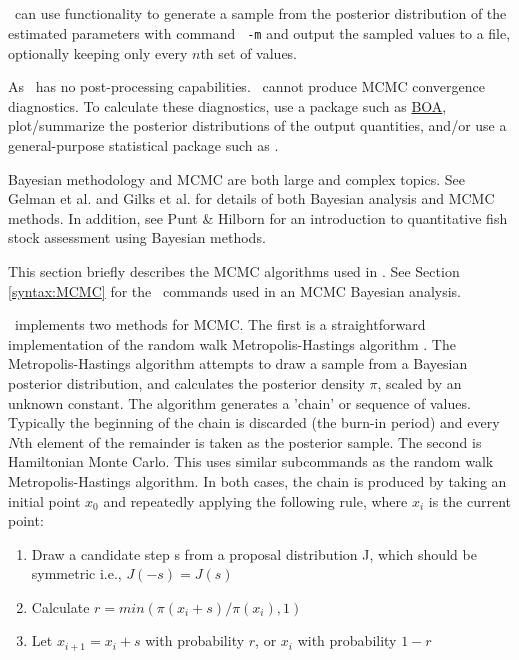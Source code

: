 \subsection{}\label{sec:MCMC}\label{sec:MCMC-RandomWalkMetropolisHastings}

\CNAME\ can use  functionality to generate a sample from the posterior distribution of the estimated parameters with command \texttt{\cname\ -m} and output the sampled values to a file, optionally keeping only every $n$th set of values.

As \CNAME\ has no post-processing capabilities. \CNAME\ cannot produce MCMC convergence diagnostics. To calculate these diagnostics, use a package such as \href{http://www.public-health.uiowa.edu/boa}{BOA}, plot/summarize the posterior distributions of the output quantities, and/or use a general-purpose statistical package such as \href{http://www.r-project.org}{\R}.

Bayesian methodology and MCMC are both large and complex topics. See Gelman et al. \citeyearpar{823} and Gilks et al. \citeyearpar{143} for details of both Bayesian analysis and MCMC methods. In addition, see Punt \& Hilborn \citeyearpar{828} for an introduction to quantitative fish stock assessment using Bayesian methods.

This section briefly describes the MCMC algorithms used in \CNAME. See Section \ref{syntax:MCMC} for the \CNAME\ commands used in an MCMC Bayesian analysis.

\CNAME\ implements two methods for MCMC. The first is a straightforward implementation of the random walk Metropolis-Hastings algorithm \citep{823,143}. The Metropolis-Hastings algorithm attempts to draw a sample from a Bayesian posterior distribution, and calculates the posterior density $\pi$, scaled by an unknown constant. The algorithm generates a 'chain' or sequence of values. Typically the beginning of the chain is discarded (the burn-in period) and every $N$th element of the remainder is taken as the posterior sample. The second is Hamiltonian Monte Carlo. This uses similar subcommands as the random walk Metropolis-Hastings algorithm. In both cases, the chain is produced by taking an initial point $x_0$ and repeatedly applying the following rule, where $x_i$ is the current point:

\begin{enumerate}
\item Draw a candidate step s from a proposal distribution J, which should be symmetric i.e., $J(-s)=J(s)$
\item Calculate $r=min(\pi(x_i+s)/\pi(x_i),1)$
\item Let $x_{i+1}=x_i+s$ with probability $r$, or $x_i$ with probability $1-r$
\end{enumerate}


